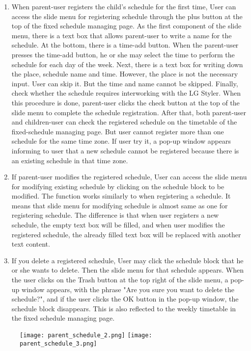 \documentclass[conference]{IEEEtran}
\begin{document}
\begin{enumerate}
\begin{enumerate}
                \begin{enumerate}
                    \item When parent-user registers the child's schedule for the first time, \hfill \break
                    User can access the slide menu for registering schedule through the plus button at the top of the fixed schedule managing page. As the first component of the slide menu, there is a text box that allows parent-user to write a name for the schedule. At the bottom, there is a time-add button. When the parent-user presses the time-add button, he or she may select the time to perform the schedule for each day of the week. Next, there is a text box for writing down the place, schedule name and time. However, the place is not the necessary input. User can skip it. But the time and name cannot be skipped. Finally, check whether the schedule requires interworking with the LG Styler. When this procedure is done, parent-user clicks the check button at the top of the slide menu to complete the schedule registration. After that, both parent-user and children-user can check the registered schedule on the timetable of the fixed-schedule managing page. But user cannot register more than one schedule for the same time zone. If user try it, a pop-up window appears informing to user that a new schedule cannot be registered because there is an existing schedule in that time zone.
                    \item If parent-user modifies the registered schedule, \hfill \break
                    User can access the slide menu for modifying existing schedule by clicking on the schedule block to be modified. The function works similarly to when registering a schedule. It means that slide menu for modifying schedule is almost same as one for registering schedule. The difference is that when user registers a new schedule, the empty text box will be filled, and when user modifies the registered schedule, the already filled text box will be replaced with another text content.
                    \item If you delete a registered schedule, \hfill \break
                    User may click the schedule block that he or she wants to delete. Then the slide menu for that schedule appears. When the user clicks on the Trash button at the top right of the slide menu, a pop-up window appears, with the phrase "Are you sure you want to delete the schedule?", and if the user clicks the OK button in the pop-up window, the schedule block disappears. This is also reflected to the weekly timetable in the fixed schedule managing page.
                \end{enumerate}
            \end{enumerate}
        \end{enumerate}
        \begin{figure}[H]
                 \centering
                 \texttt{[image: parent\_schedule\_2.png]}
                 \texttt{[image: parent\_schedule\_3.png]}
                 \end{figure}
\end{document}
